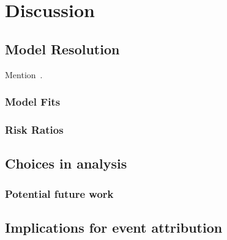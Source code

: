\section{Discussion}\label{sec:discussion}

\begin{comment}
This section should give a picture of what you have taken out of your
project and how you can put it into context.

This section should summarise the results obtained, detail conclusions
reached, suggest future work, and changes that you would make if you
repeated the project.
\end{comment}

\subsection{Model Resolution}\label{subsec:dismodeldef}

Mention~\cite{Kendon_Fischer_Short_2023}.

\subsubsection{Model Fits}

\subsubsection{Risk Ratios}

\subsection{Choices in analysis}\label{subsec:diseventdef}



\subsubsection{Potential future work}

\subsection{Implications for event attribution}\label{subsec:disfield}